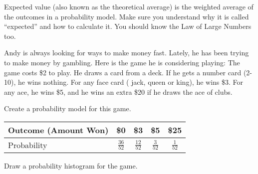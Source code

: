 \documentclass[12pt,answers]{exam}
\newcounter{countA}
\begin{document}
Expected value (also known as the theoretical average) is the weighted
average of the outcomes in a probability model. Make sure you understand
why it is called ``expected'' and how to calculate it. You should know
the Law of Large Numbers too.

\begin{questions}
\setcounter{question}{\value{countA}}

\item
  Andy is always looking for ways to make money fast. Lately, he has
  been trying to make money by gambling. Here is the game he is
  considering playing: The game costs \$2 to play. He draws a card from
  a deck. If he gets a number card (2-10), he wins nothing. For any face
  card ( jack, queen or king), he wins \$3. For any ace, he wins \$5,
  and he wins an extra \$20 if he draws the ace of clubs.

  \begin{parts}
  \item
    Create a probability model for this game.
\begin{solution}
\begin{center}
  \renewcommand{\arraystretch}{1.5}
\begin{tabular}{l|c|c|c|c}
Outcome (Amount Won) & \$0 & \$3 & \$5 & \$25 \\ \hline
Probability & $\frac{36}{52}$ & $\frac{12}{52}$ & $\frac{3}{52}$ & $\frac{1}{52}$
\end{tabular}
\end{center}
\end{solution}
\vfill
  \item
    Draw a probability histogram for the game.
\begin{solution}
\begin{center}


\end{center}
\end{solution}
\end{parts}
\end{questions}
\end{document}
